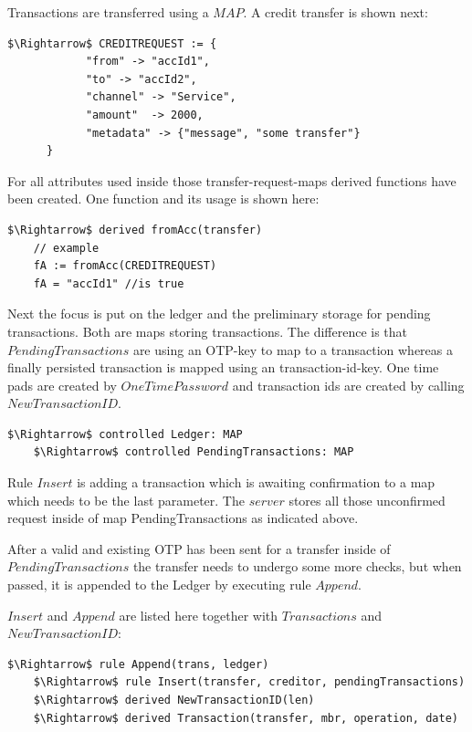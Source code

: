 Transactions are transferred using a $MAP$. A credit transfer is shown next:

\begin{lstlisting}[language=bsl,mathescape=true]
	$\Rightarrow$ CREDITREQUEST := {
			"from" -> "accId1",
			"to" -> "accId2",
			"channel" -> "Service",
			"amount"  -> 2000,
			"metadata" -> {"message", "some transfer"}
	  }	
\end{lstlisting}

For all attributes used inside those transfer-request-maps derived functions have been created. One function and its usage is shown here:

\begin{lstlisting}[language=bsl,mathescape=true]
	$\Rightarrow$ derived fromAcc(transfer)
	// example
	fA := fromAcc(CREDITREQUEST)
	fA = "accId1" //is true
\end{lstlisting}

Next the focus is put on the ledger and the preliminary storage for pending transactions. Both are maps storing transactions. The difference is that $PendingTransactions$ are using an OTP-key to map to a transaction whereas a finally persisted transaction is mapped using an transaction-id-key. One time pads are created by $OneTimePassword$ and transaction ids are created by calling $NewTransactionID$.

\begin{lstlisting}[language=bsl,mathescape=true]
	$\Rightarrow$ controlled Ledger: MAP
	$\Rightarrow$ controlled PendingTransactions: MAP
\end{lstlisting}

Rule $Insert$ is adding a transaction which is awaiting confirmation to a map which needs to be the last parameter. The $server$ stores all those unconfirmed request inside of map PendingTransactions as indicated above.

After a valid and existing OTP has been sent for a transfer inside of $PendingTransactions$ the transfer needs to undergo some more checks, but when passed, it is appended to the Ledger by executing rule $Append$.

$Insert$ and $Append$ are listed here together with $Transactions$ and $NewTransactionID$:

\begin{lstlisting}[language=bsl,mathescape=true]
	$\Rightarrow$ rule Append(trans, ledger)
	$\Rightarrow$ rule Insert(transfer, creditor, pendingTransactions)
	$\Rightarrow$ derived NewTransactionID(len)
	$\Rightarrow$ derived Transaction(transfer, mbr, operation, date)
\end{lstlisting}

